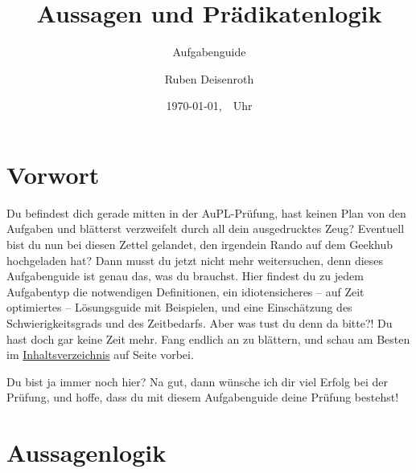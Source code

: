 \documentclass[
    ngerman,
    color=3b,
    summary,
    boxarc,
    main,
    fleqn,
    leqno,
]{rubos-tuda-template}
\title[AuPL]{Aussagen und Prädikatenlogik}
\subtitle{Aufgabenguide}
\author{Ruben Deisenroth}
\date{\today,~\currenttime~Uhr}
\newcommand*\cleartoleftpage{%
    \clearpage
    \ifodd\value{page}\hbox{}\newpage\fi
}
\begin{document}
    \label{toc}\maketitle{}
    \section{Vorwort}
    Du befindest dich gerade mitten in der AuPL-Prüfung, hast keinen Plan von den Aufgaben und blätterst verzweifelt durch all dein ausgedrucktes Zeug? Eventuell bist du nun bei diesen Zettel gelandet, den irgendein Rando auf dem Geekhub hochgeladen hat? Dann musst du jetzt nicht mehr weitersuchen, denn dieses Aufgabenguide ist genau das, was du brauchst. Hier findest du zu jedem Aufgabentyp die notwendigen Definitionen, ein idiotensicheres -- auf Zeit optimiertes -- Lösungsguide mit Beispielen, und eine Einschätzung des Schwierigkeitsgrads und des Zeitbedarfs. Aber was tust du denn da bitte?! Du hast doch gar keine Zeit mehr. Fang endlich an zu blättern, und schau am Besten im \hyperref[toc]{Inhaltsverzeichnis} auf Seite \pageref{toc} vorbei.

    Du bist ja immer noch hier? Na gut, dann wünsche ich dir viel Erfolg bei der Prüfung, und hoffe, dass du mit diesem Aufgabenguide deine Prüfung bestehst!
    \tableofcontents %



    \vspace{\fill}
    \mbox{}
    \cleartoleftpage{}
    \section{Aussagenlogik}
\end{document}
